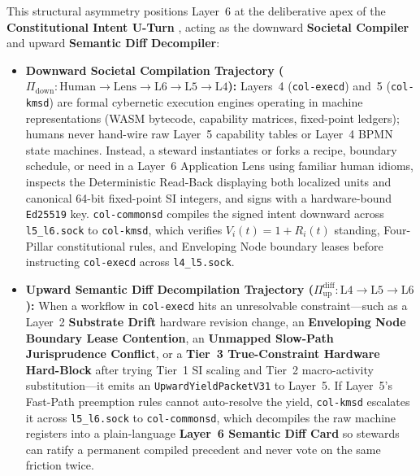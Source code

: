 This structural asymmetry positions Layer~6 at the deliberative apex of the
\textbf{Constitutional Intent U-Turn} \parencite{beer1979}, acting as the downward
\textbf{Societal Compiler} and upward \textbf{Semantic Diff Decompiler}:

\begin{itemize}
\item \textbf{Downward Societal Compilation Trajectory ($\Pi_{\mathrm{down}} : \mathrm{Human} \to \mathrm{Lens} \to \mathrm{L6} \to \mathrm{L5} \to \mathrm{L4}$):}
      Layers~4 (\texttt{col-execd}) and~5 (\texttt{col-kmsd}) are formal cybernetic execution
      engines operating in machine representations (WASM bytecode, capability matrices,
      fixed-point ledgers); humans never hand-wire raw Layer~5 capability tables or Layer~4 BPMN
      state machines. Instead, a steward instantiates or forks a recipe, boundary schedule, or
      need in a Layer~6 Application Lens using familiar human idioms, inspects the Deterministic
      Read-Back displaying both localized units and canonical 64-bit fixed-point SI integers, and
      signs with a hardware-bound \texttt{Ed25519} key. \texttt{col-commonsd} compiles the signed
      intent downward across \texttt{l5\_l6.sock} to \texttt{col-kmsd}, which verifies
      $V_i(t) = 1 + R_i(t)$ standing, Four-Pillar constitutional rules, and Enveloping Node
      boundary leases before instructing \texttt{col-execd} across \texttt{l4\_l5.sock}.
\item \textbf{Upward Semantic Diff Decompilation Trajectory ($\Pi_{\mathrm{up}}^{\mathrm{diff}} : \mathrm{L4} \to \mathrm{L5} \to \mathrm{L6}$):}
      When a workflow in \texttt{col-execd} hits an unresolvable constraint---such as a Layer~2
      \textbf{Substrate Drift} hardware revision change, an \textbf{Enveloping Node Boundary Lease
      Contention}, an \textbf{Unmapped Slow-Path Jurisprudence Conflict}, or a \textbf{Tier~3
      True-Constraint Hardware Hard-Block} after trying Tier~1 SI scaling and Tier~2 macro-activity
      substitution---it emits an \texttt{UpwardYieldPacketV31} to Layer~5. If Layer~5's Fast-Path
      preemption rules cannot auto-resolve the yield, \texttt{col-kmsd} escalates it across
      \texttt{l5\_l6.sock} to \texttt{col-commonsd}, which decompiles the raw machine registers
      into a plain-language \textbf{Layer~6 Semantic Diff Card} so stewards can ratify a permanent
      compiled precedent and never vote on the same friction twice.
\end{itemize}


